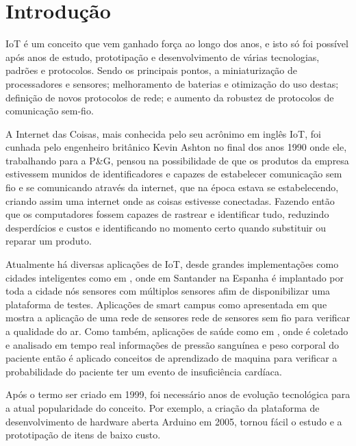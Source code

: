 \chapter[Introdução]{Introdução}
\label{cap:intro}

IoT é um conceito que vem ganhado força ao longo dos anos, e isto só foi possível após anos de estudo, prototipação e desenvolvimento de várias tecnologias, padrões e protocolos. Sendo os principais pontos, a miniaturização de processadores e sensores; melhoramento de baterias e otimização do uso destas; definição de novos protocolos de rede; e aumento da robustez de protocolos de comunicação sem-fio.

A Internet das Coisas, mais conhecida pelo seu acrônimo em inglês IoT, foi cunhada pelo engenheiro britânico Kevin Ashton no final dos anos 1990 onde ele, trabalhando para a P\&G, pensou na possibilidade de que os produtos da empresa estivessem munidos de identificadores e capazes de estabelecer comunicação sem fio e se comunicando através da internet, que na época estava se estabelecendo, criando assim uma internet onde as coisas estivesse conectadas\cite{KA_IOT}. Fazendo então que os computadores fossem capazes de rastrear e identificar tudo, reduzindo desperdícios e custos e identificando no momento certo quando substituir ou reparar um produto\cite{lopezIOT}.

Atualmente há diversas aplicações de IoT, desde grandes implementações como cidades inteligentes como em \cite{sotres2017practical}, onde em Santander na Espanha é implantado por toda a cidade nós sensores com múltiplos sensores afim de disponibilizar uma plataforma de testes. Aplicações de smart campus como apresentada em \cite{wang2017performance} que mostra a aplicação de uma rede de sensores rede de sensores sem fio para verificar a qualidade do ar. Como também, aplicações de saúde como em \cite{zhang2015remote}, onde é coletado e analisado em tempo real informações de pressão sanguínea e peso corporal do paciente então é aplicado conceitos de aprendizado de maquina para verificar a probabilidade do paciente ter um evento de insuficiência cardíaca.

Após o termo ser criado em 1999, foi necessário anos de evolução tecnológica para a atual popularidade do conceito. Por exemplo, a criação da plataforma de desenvolvimento de hardware aberta Arduino em 2005\cite{OC_ARDUINO}, tornou fácil o estudo e a prototipação de itens de baixo custo. 


